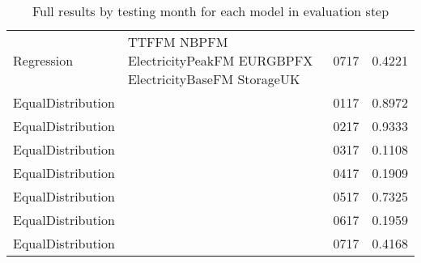 \begin{table}[h!]
\begin{adjustbox}{max width=\textwidth}
\begin{tabular}{lllr}
  Regression & TTFFM NBPFM ElectricityPeakFM EURGBPFX ElectricityBaseFM StorageUK & 0717 & 0.4221 \\ 
  EqualDistribution &  & 0117 & 0.8972 \\ 
  EqualDistribution &  & 0217 & 0.9333 \\ 
  EqualDistribution &  & 0317 & 0.1108 \\ 
  EqualDistribution &  & 0417 & 0.1909 \\ 
  EqualDistribution &  & 0517 & 0.7325 \\ 
  EqualDistribution &  & 0617 & 0.1959 \\ 
  EqualDistribution &  & 0717 & 0.4168 \\ 
   \hline
 \end{tabular}
\end{adjustbox}
\caption{Full results by testing month for each model in evaluation step} 
\label{tab:binary.eval.short}
\end{table}

